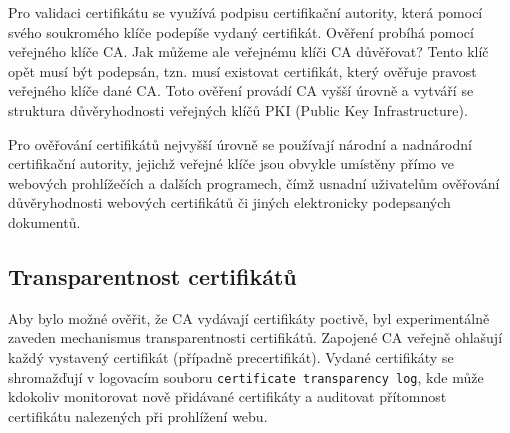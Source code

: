 Pro validaci certifikátu se využívá podpisu certifikační autority, která pomocí svého soukromého klíče podepíše vydaný certifikát. Ověření probíhá pomocí veřejného klíče CA. Jak můžeme ale veřejnému klíči CA důvěřovat? Tento klíč opět musí být podepsán, tzn. musí existovat certifikát, který ověřuje pravost veřejného klíče dané CA. Toto ověření provádí CA vyšší úrovně a vytváří se struktura důvěryhodnosti veřejných klíčů PKI (Public Key Infrastructure). 

Pro ověřování certifikátů nejvyšší úrovně se používají národní a nadnárodní certifikační autority, jejichž veřejné klíče jsou obvykle umístěny přímo ve webových prohlížečích a dalších programech, čímž usnadní uživatelům ověřování důvěryhodnosti webových certifikátů či jiných elektronicky podepsaných dokumentů. 

\subsection{Transparentnost certifikátů}
Aby bylo možné ověřit, že CA vydávají certifikáty poctivě, byl experimentálně zaveden mechanismus transparentnosti certifikátů. Zapojené CA veřejně ohlašují každý vystavený certifikát (případně precertifikát). Vydané certifikáty se shromažďují v logovacím souboru {\tt certificate transparency log}, kde může kdokoliv monitorovat nově
přidávané certifikáty a auditovat přítomnost certifikátu nalezených při prohlížení webu.
